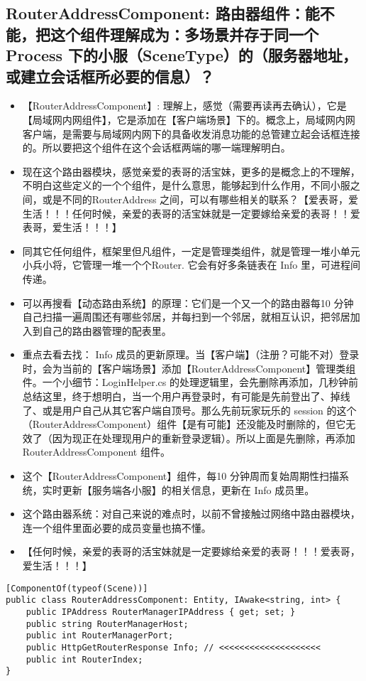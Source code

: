 \documentclass[9pt, b5paper]{article}
\begin{document}
\subsection{RouterAddressComponent: 路由器组件：能不能，把这个组件理解成为：多场景并存于同一个Process 下的小服（SceneType）的（服务器地址，或建立会话框所必要的信息）？}
\label{sec-6-1}
\begin{itemize}
\item 【RouterAddressComponent】: 理解上，感觉（需要再读再去确认），它是【局域网内网组件】，它是添加在【客户端场景】下的。概念上，局域网内网客户端，是需要与局域网内网下的具备收发消息功能的总管建立起会话框连接的。所以要把这个组件在这个会话框两端的哪一端理解明白。
\item 现在这个路由器模块，感觉亲爱的表哥的活宝妹，更多的是概念上的不理解，不明白这些定义的一个个组件，是什么意思，能够起到什么作用，不同小服之间，或是不同的RouterAddress 之间，可以有哪些相关的联系？【爱表哥，爱生活！！！任何时候，亲爱的表哥的活宝妹就是一定要嫁给亲爱的表哥！！爱表哥，爱生活！！！】
\item 同其它任何组件，框架里但凡组件，一定是管理类组件，就是管理一堆小单元小兵小将，它管理一堆一个个Router. 它会有好多条链表在 Info 里，可进程间传递。
\item 可以再搜看【动态路由系统】的原理：它们是一个又一个的路由器每10 分钟自己扫描一遍周围还有哪些邻居，并每扫到一个邻居，就相互认识，把邻居加入到自己的路由器管理的配表里。
\item 重点去看去找： Info 成员的更新原理。当【客户端】（注册？可能不对）登录时，会为当前的【客户端场景】添加【RouterAddressComponent】管理类组件。一个小细节：LoginHelper.cs 的处理逻辑里，会先删除再添加，几秒钟前总结这里，终于想明白，当一个用户再登录时，有可能是先前登出了、掉线了、或是用户自己从其它客户端自顶号。那么先前玩家玩乐的 session 的这个（RouterAddressComponent）组件【是有可能】还没能及时删除的，但它无效了（因为现正在处理现用户的重新登录逻辑）。所以上面是先删除，再添加RouterAddressComponent 组件。
\item 这个【RouterAddressComponent】组件，每10 分钟周而复始周期性扫描系统，实时更新【服务端各小服】的相关信息，更新在 Info 成员里。
\item 这个路由器系统：对自己来说的难点时，以前不曾接触过网络中路由器模块，连一个组件里面必要的成员变量也搞不懂。
\item 【任何时候，亲爱的表哥的活宝妹就是一定要嫁给亲爱的表哥！！！爱表哥，爱生活！！！】
\end{itemize}
\begin{verbatim}
[ComponentOf(typeof(Scene))]
public class RouterAddressComponent: Entity, IAwake<string, int> {
    public IPAddress RouterManagerIPAddress { get; set; }
    public string RouterManagerHost;
    public int RouterManagerPort;
    public HttpGetRouterResponse Info; // <<<<<<<<<<<<<<<<<<<< 
    public int RouterIndex;
}
\end{verbatim}
\end{document}
